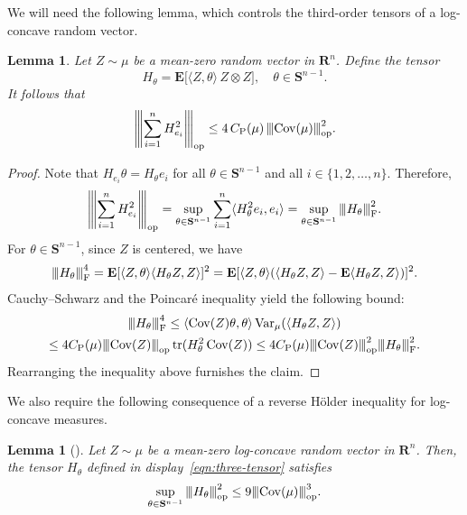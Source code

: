 \documentclass[11pt]{amsart}
\newcommand{\R}{\mathbf R}
\newcommand{\sphere}{\mathbf{S}^{n-1}}
\newcommand{\E}{\mathbf E}
\newcommand{\Cov}{\operatorname{Cov}}
\newcommand{\Var}{\operatorname{Var}}
\newcommand{\tr}{\operatorname{tr}}
\let\trace\tr
\newcommand{\1}{\mathbf 1}
\newcommand{\vertiii}[1]{{\left\vert\kern-0.25ex\left\vert\kern-0.25ex\left\vert #1 
\right\vert\kern-0.25ex\right\vert\kern-0.25ex\right\vert}}
\newcommand{\opnorm}[1]{\vertiii{#1}_{\rm op}}
\newcommand{\fronorm}[1]{\vertiii{#1}_{\rm F}}
\newcommand{\PoinConst}{C_{\rm P}}
\theoremstyle{plain}
\newtheorem{lemma}[theorem]{Lemma}
\begin{document}
We will need the following lemma, which controls the third-order tensors of a log-concave random vector. 
\begin{lemma}
\label{lem:mean-zero-log-ccv}
Let $Z \sim \mu$ be a mean-zero random vector in $\R^n$. Define the tensor 
\begin{equation}\label{eqn:three-tensor}
H_{\theta} = \E\Big[\langle Z, \theta \rangle\,  Z \otimes Z \Big], \quad \theta \in \sphere.
\end{equation}
It follows that
\[
\opnorm{\sum_{i=1}^n H_{e_i}^2} \leq 4\, \PoinConst(\mu) \, \opnorm{\Cov(\mu)}^2.
\]
\end{lemma}
\begin{proof}
Note that $H_{e_i} \theta = H_\theta e_i$ for all $\theta \in \sphere$ and all $i \in \{1, 2, \dots, n\}$. Therefore, 
\[
\opnorm{\sum_{i=1}^n H_{e_i}^2} = \sup_{\theta \in \sphere} \sum_{i=1}^n \langle H_\theta^2 e_i, e_i\rangle = \sup_{\theta \in \sphere}\fronorm{H_\theta}^2. 
\] 
For $\theta \in \sphere$, since $Z$ is centered, we have
\begin{align*}
\fronorm{H_\theta}^4
= \E[\langle Z, \theta \rangle \langle H_\theta Z, Z \rangle]^2 = 
\E[\langle Z, \theta \rangle (\langle H_\theta Z, Z \rangle - \E\langle H_\theta Z, Z \rangle) ]^2.
\end{align*}
Cauchy--Schwarz and the Poincar\'{e} inequality yield the following bound:
\begin{multline*}
\fronorm{H_\theta}^4 
\leq \langle \Cov(Z) \theta, \theta\rangle
\Var_\mu( \langle H_\theta Z, Z \rangle) 
\\ \leq
4 \PoinConst(\mu) \opnorm{\Cov(Z)} \trace(H_\theta^2 \Cov(Z)) 
\leq 4 \PoinConst(\mu) \opnorm{\Cov(Z)}^2 \fronorm{H_\theta}^2. 
\end{multline*}
Rearranging the inequality above furnishes the claim.
\end{proof}

We also require the following consequence of a reverse H\"older inequality for log-concave measures. 

\begin{lemma}[{\cite[Lemma~A.2]{BizKla26}}]
\label{lem:three-tensor-log-ccv}
    Let $Z \sim \mu$ be a mean-zero log-concave random vector in $\R^n$. Then, 
    the tensor $H_\theta$ defined in display~\eqref{eqn:three-tensor} satisfies 
    \[
    \sup_{\theta \in \sphere} \opnorm{H_\theta}^2 \leq 9 \opnorm{\Cov(\mu)}^3. 
    \]
\end{lemma}
\end{document}
